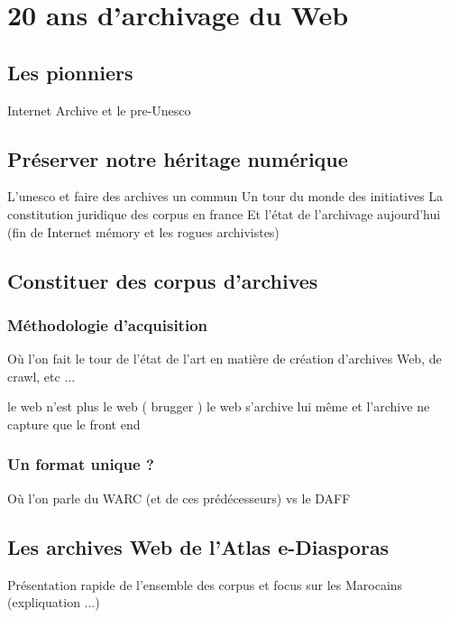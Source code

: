 \documentclass{tufte-book}
\begin{document}

\chapter{20 ans d'archivage du Web}

\section{Les pionniers}

Internet Archive et le pre-Unesco

\section{Préserver notre héritage numérique}

L'unesco et faire des archives un commun
Un tour du monde des initiatives 
La constitution juridique des corpus en france 
Et l'état de l'archivage aujourd'hui (fin de Internet mémory et les rogues archivistes)

\section{Constituer des corpus d'archives}

\subsection{Méthodologie d'acquisition}

Où l'on fait le tour de l'état de l'art en matière de création d'archives Web, de crawl, etc ...

le web n'est plus le web ( brugger ) le web s'archive lui même et l'archive ne capture que le front end

\subsection{Un format unique ?}

Où l'on parle du WARC (et de ces prédécesseurs) vs le DAFF

\section{Les archives Web de l'Atlas e-Diasporas}

Présentation rapide de l'ensemble des corpus et focus sur les Marocains (expliquation ...)
\end{document}

